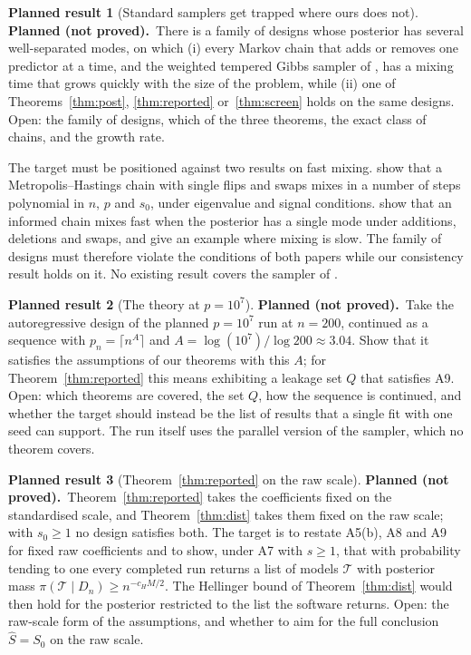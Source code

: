 \documentclass[11pt]{article}
\newcommand{\Sz}{S_0}
\newcommand{\sz}{s_0}
\newcommand{\Shat}{\hat S}
\newcommand{\Dn}{D_n}
\theoremstyle{plain}
\theoremstyle{definition}
\newtheorem{planned}{Planned result}
\newcommand{\notproved}{\textbf{Planned (not proved).}\ }
\begin{document}
\begin{planned}[Standard samplers get trapped where ours does not]
\notproved There is a family of designs whose posterior has several well-separated modes, on which (i) every Markov
chain that adds or removes one predictor at a time, and the weighted tempered Gibbs sampler of
\citet{ZanellaRoberts2019}, has a mixing time that grows quickly with the size of the problem, while (ii) one of
Theorems~\ref{thm:post}, \ref{thm:reported} or~\ref{thm:screen} holds on the same designs. Open: the family of designs,
which of the three theorems, the exact class of chains, and the growth rate.

The target must be positioned against two results on fast mixing. \citet{YangWainwrightJordan2016} show that a
Metropolis--Hastings chain with single flips and swaps mixes in a number of steps polynomial in $n$, $p$ and $\sz$,
under eigenvalue and signal conditions. \citet{ZhouYangVatsRobertsRosenthal2022} show
that an informed chain mixes fast when the posterior has a single mode under additions, deletions and swaps, and give
an example where mixing is slow. The family of designs must therefore violate the conditions of both papers while our
consistency result holds on it. No existing result covers the sampler of \citet{ZanellaRoberts2019}.
\end{planned}

\begin{planned}[The theory at $p=10^7$]
\notproved Take the autoregressive design of the planned $p=10^7$ run at $n=200$, continued as a sequence with
$p_n=\lceil n^{A}\rceil$ and $A=\log(10^7)/\log200\approx3.04$. Show that it satisfies the assumptions of our theorems
with this $A$; for Theorem~\ref{thm:reported} this means exhibiting a leakage set $Q$ that satisfies A9. Open: which
theorems are covered, the set $Q$, how the sequence is continued, and whether the target should instead be the list of
results that a single fit with one seed can support. The run itself uses the parallel version of the sampler, which no
theorem covers.
\end{planned}

\begin{planned}[Theorem~\ref{thm:reported} on the raw scale]
\notproved Theorem~\ref{thm:reported} takes the coefficients fixed on the standardised scale, and
Theorem~\ref{thm:dist} takes them fixed on the raw scale; with $\sz\ge1$ no design satisfies both. The target is to
restate A5(b), A8 and A9 for fixed raw coefficients and to show, under A7 with $s\ge1$, that with probability tending to
one every completed run returns a list of models $\mathcal T$ with posterior mass
$\pi(\mathcal T\mid\Dn)\ge n^{-c_HM/2}$. The Hellinger bound of Theorem~\ref{thm:dist} would then hold for the posterior
restricted to the list the software returns. Open: the raw-scale form of the assumptions, and whether to aim for the
full conclusion $\Shat=\Sz$ on the raw scale.
\end{planned}
\end{document}
